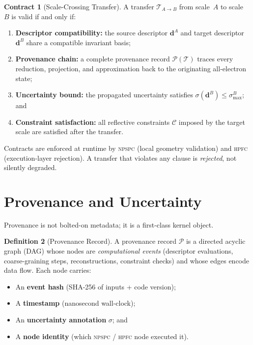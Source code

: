 \documentclass[11pt,a4paper]{article}
\theoremstyle{definition}
\newtheorem{definition}{Definition}[section]
\newtheorem{contract}[definition]{Contract}
\theoremstyle{plain}
\newcommand{\NPSPC}{\textsc{npspc}}
\newcommand{\HPFC}{\textsc{hpfc}}
\newcommand{\desc}{\boldsymbol{d}}
\newcommand{\prov}{\mathcal{P}}
\newcommand{\transfer}{\mathcal{T}}
\newcommand{\constraint}{\mathcal{C}}
\newcommand{\unc}{\sigma}
\begin{document}
\begin{contract}[Scale-Crossing Transfer]
\label{con:transfer}
A transfer $\transfer_{A \to B}$ from scale~$A$ to scale~$B$ is valid
if and only if:
\begin{enumerate}[label=(\roman*)]
  \item \textbf{Descriptor compatibility:}
        the source descriptor $\desc^{A}$ and target descriptor
        $\desc^{B}$ share a compatible invariant basis;
  \item \textbf{Provenance chain:}
        a complete provenance record $\prov(\transfer)$ traces every
        reduction, projection, and approximation back to the
        originating all-electron state;
  \item \textbf{Uncertainty bound:}
        the propagated uncertainty satisfies
        $\unc(\desc^{B}) \le \unc_{\max}^{B}$; and
  \item \textbf{Constraint satisfaction:}
        all reflective constraints $\constraint$ imposed by the
        target scale are satisfied after the transfer.
\end{enumerate}
\end{contract}

\noindent
Contracts are enforced at runtime by \NPSPC{} (local geometry
validation) and \HPFC{} (execution-layer rejection).  A transfer
that violates any clause is \emph{rejected}, not silently degraded.


\section{Provenance and Uncertainty}
\label{sec:provenance}

Provenance is not bolted-on metadata; it is a first-class kernel
object.

\begin{definition}[Provenance Record]
\label{def:prov}
A provenance record $\prov$ is a directed acyclic graph (DAG) whose
nodes are \emph{computational events} (descriptor evaluations,
coarse-graining steps, reconstructions, constraint checks) and whose
edges encode data flow.  Each node carries:
\begin{itemize}[nosep]
  \item An \textbf{event hash} (SHA-256 of inputs + code version);
  \item A \textbf{timestamp} (nanosecond wall-clock);
  \item An \textbf{uncertainty annotation} $\unc$; and
  \item A \textbf{node identity} (which \NPSPC{} / \HPFC{} node executed it).
\end{itemize}
\end{definition}
\end{document}
